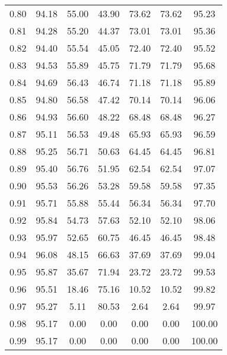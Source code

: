 \begin{tabular}{|c|c|c|c|c|c|c|}
      0.80 &     94.18 &     55.00 &      43.90 &   73.62 &      73.62 &         95.23 \\
      0.81 &     94.28 &     55.20 &      44.37 &   73.01 &      73.01 &         95.36 \\
      0.82 &     94.40 &     55.54 &      45.05 &   72.40 &      72.40 &         95.52 \\
      0.83 &     94.53 &     55.89 &      45.75 &   71.79 &      71.79 &         95.68 \\
      0.84 &     94.69 &     56.43 &      46.74 &   71.18 &      71.18 &         95.89 \\
      0.85 &     94.80 &     56.58 &      47.42 &   70.14 &      70.14 &         96.06 \\
      0.86 &     94.93 &     56.60 &      48.22 &   68.48 &      68.48 &         96.27 \\
      0.87 &     95.11 &     56.53 &      49.48 &   65.93 &      65.93 &         96.59 \\
      0.88 &     95.25 &     56.71 &      50.63 &   64.45 &      64.45 &         96.81 \\
      0.89 &     95.40 &     56.76 &      51.95 &   62.54 &      62.54 &         97.07 \\
      0.90 &     95.53 &     56.26 &      53.28 &   59.58 &      59.58 &         97.35 \\
      0.91 &     95.71 &     55.88 &      55.44 &   56.34 &      56.34 &         97.70 \\
      0.92 &     95.84 &     54.73 &      57.63 &   52.10 &      52.10 &         98.06 \\
      0.93 &     95.97 &     52.65 &      60.75 &   46.45 &      46.45 &         98.48 \\
      0.94 &     96.08 &     48.15 &      66.63 &   37.69 &      37.69 &         99.04 \\
      0.95 &     95.87 &     35.67 &      71.94 &   23.72 &      23.72 &         99.53 \\
      0.96 &     95.51 &     18.46 &      75.16 &   10.52 &      10.52 &         99.82 \\
      0.97 &     95.27 &      5.11 &      80.53 &    2.64 &       2.64 &         99.97 \\
      0.98 &     95.17 &      0.00 &       0.00 &    0.00 &       0.00 &        100.00 \\
      0.99 &     95.17 &      0.00 &       0.00 &    0.00 &       0.00 &        100.00 \\
\bottomrule
\end{tabular}
